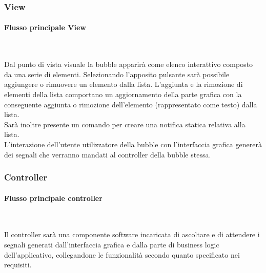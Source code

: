 \subsubsection{View}
\begin{samepage}
	\paragraph{Flusso principale View}\mbox{}\\
\end{samepage}
Dal punto di vista visuale la bubble apparirà come elenco interattivo composto da una serie di elementi. Selezionando l'apposito pulsante sarà possibile aggiungere o rimuovere un elemento dalla lista. L'aggiunta e la rimozione di elementi della lista comportano un aggiornamento della parte grafica con la conseguente aggiunta o rimozione dell'elemento (rappresentato come testo) dalla lista.\\
Sarà inoltre presente un comando per creare una notifica statica relativa alla lista.\\
L'interazione dell'utente utilizzatore della bubble con l'interfaccia grafica genererà dei segnali che verranno mandati al controller della bubble stessa.

\subsubsection{Controller}
\begin{samepage}
	\paragraph{Flusso principale controller}\mbox{}\\
\end{samepage}
Il controller sarà una componente software incaricata di ascoltare e di attendere i segnali generati dall'interfaccia grafica e dalla parte di business logic dell'applicativo, collegandone le funzionalità secondo quanto specificato nei requisiti. 

